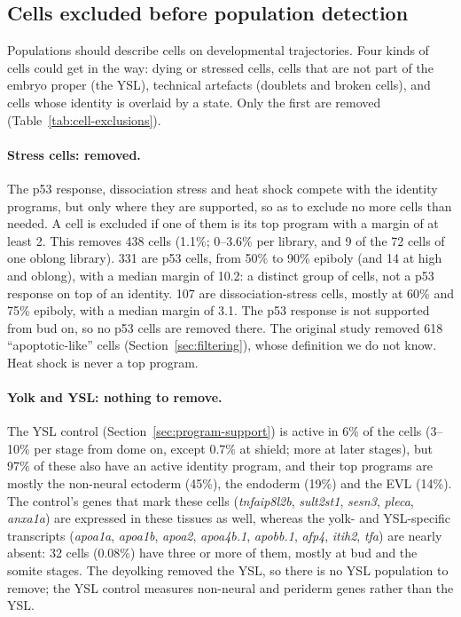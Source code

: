 \documentclass[11pt,a4paper]{article}
\begin{document}
\subsection{Cells excluded before population detection}
\label{sec:exclusions}

Populations should describe cells on developmental trajectories. Four kinds of cells could get in the way: dying or stressed cells, cells that are not part of the embryo proper (the YSL), technical artefacts (doublets and broken cells), and cells whose identity is overlaid by a state. Only the first are removed (Table~\ref{tab:cell-exclusions}).

\paragraph{Stress cells: removed.} The p53 response, dissociation stress and heat shock compete with the identity programs, but only where they are supported, so as to exclude no more cells than needed. A cell is excluded if one of them is its top program with a margin of at least 2. This removes 438 cells (1.1\%; 0--3.6\% per library, and 9 of the 72 cells of one oblong library). 331 are p53 cells, from 50\% to 90\% epiboly (and 14 at high and oblong), with a median margin of 10.2: a distinct group of cells, not a p53 response on top of an identity. 107 are dissociation-stress cells, mostly at 60\% and 75\% epiboly, with a median margin of 3.1. The p53 response is not supported from bud on, so no p53 cells are removed there. The original study removed 618 ``apoptotic-like'' cells (Section~\ref{sec:filtering}), whose definition we do not know. Heat shock is never a top program.

\paragraph{Yolk and YSL: nothing to remove.} The YSL control (Section~\ref{sec:program-support}) is active in 6\% of the cells (3--10\% per stage from dome on, except 0.7\% at shield; more at later stages), but 97\% of these also have an active identity program, and their top programs are mostly the non-neural ectoderm (45\%), the endoderm (19\%) and the EVL (14\%). The control's genes that mark these cells (\emph{tnfaip8l2b}, \emph{sult2st1}, \emph{sesn3}, \emph{pleca}, \emph{anxa1a}) are expressed in these tissues as well, whereas the yolk- and YSL-specific transcripts (\emph{apoa1a}, \emph{apoa1b}, \emph{apoa2}, \emph{apoa4b.1}, \emph{apobb.1}, \emph{afp4}, \emph{itih2}, \emph{tfa}) are nearly absent: 32 cells (0.08\%) have three or more of them, mostly at bud and the somite stages. The deyolking removed the YSL, so there is no YSL population to remove; the YSL control measures non-neural and periderm genes rather than the YSL.
\end{document}
